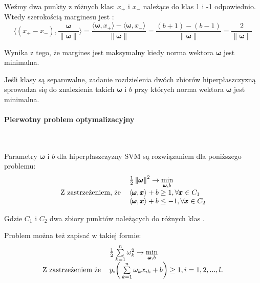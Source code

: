 \documentclass[paper=a4, fontsize=11pt]{scrartcl} %
\newcommand{\myparagraph}[1]{\paragraph{#1}\mbox{}\\}
\numberwithin{equation}{section} %
\numberwithin{figure}{section} %
\newcommand{\norm}[1]{\left\lVert#1\right\rVert}
\begin{document}
    Weźmy dwa punkty z różnych klas: $x_+$ i $x_-$ należące do klas 1 i -1 odpowiednio. Wtedy
    szerokością marginesu jest \cite{woroncow2007lekcii}:
    \begin{equation}
        \bigg\langle (x_+ - x_-), \frac{\pmb{\omega}}{\norm{\pmb{\omega}}} \bigg\rangle
        = \frac{\langle \pmb{\omega}, x_+ \rangle - \langle \pmb{\omega}, x_-\rangle}{\norm{\pmb{\omega}}} 
        = \frac{(b + 1) - ( b - 1)}{\norm{\pmb{\omega}}}
        = \frac{2}{\norm{\pmb{\omega}}}
    \end{equation}
        
    \par Wynika z tego, że margines jest maksymalny kiedy norma wektora
    $\pmb{\omega}$ jest minimalna.  
    \par Jeśli klasy są separowalne, zadanie rozdzielenia dwóch zbiorów hiperpłaszczyzną
    sprowadza się do znalezienia takich $\pmb{\omega}$ i $b$ przy których norma wektora
    $\pmb{\omega}$ jest minimalna.

\newpage
\myparagraph{Pierwotny problem optymalizacyjny}
    \par Parametry $\pmb{\omega}$ i $b$ dla hiperpłaszczyzny SVM są rozwiązaniem dla poniższego
    problemu:
    \begin{equation}
        \begin{tabular}{rl}
            & $\frac{1}{2}\norm{\pmb{\omega}}^2 \rightarrow \min\limits_{\pmb{\omega},b}$ \\
            Z zastrzeżeniem, że & $\langle \pmb{\omega}, \pmb{x} \rangle + b \geq 1, \forall \pmb{x} \in C_1$ \\
                               & $\langle \pmb{\omega}, \pmb{x} \rangle + b \leq -1, \forall \pmb{x} \in C_2$

        \end{tabular}
    \end{equation}

    \par Gdzie $C_1$ i $C_2$ dwa zbiory punktów należących do różnych klas
    \cite{nefedov2016support}.
    \par Problem można też zapisać w takiej formie:
    \begin{equation} \label{eq:primal}
        \begin{tabular}{rl}
            & $\frac{1}{2} \sum\limits_{k=1}^n \omega_{k}^2 \rightarrow \min\limits_{\pmb{\omega},b}$ \\
            Z zastrzeżeniem że & $y_i \bigg(\sum\limits_{k=1}^n \omega_k x_{ik} + b \bigg) \geq
            1, i=1,2,...,l.$
        \end{tabular}
    \end{equation}
\end{document}
